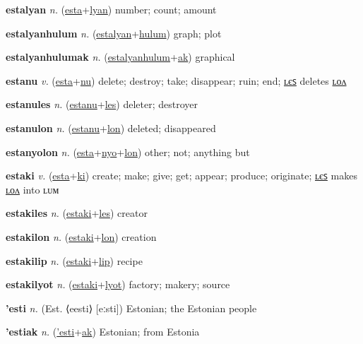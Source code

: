 \textbf{\hypertarget{estalyan}{estalyan}} \textit{n.} (\hyperlink{esta}{esta}+\allowbreak \hyperlink{lyan}{lyan})
number; count; amount

\textbf{\hypertarget{estalyanhulum}{estalyanhulum}} \textit{n.} (\hyperlink{estalyan}{estalyan}+\allowbreak \hyperlink{hulum}{hulum})
graph; plot

\textbf{\hypertarget{estalyanhulumak}{estalyanhulumak}} \textit{n.} (\hyperlink{estalyanhulum}{estalyanhulum}+\allowbreak \hyperlink{ak}{ak})
graphical

\textbf{\hypertarget{estanu}{estanu}} \textit{v.} (\hyperlink{esta}{esta}+\allowbreak \hyperlink{nu}{nu})
delete; destroy; take; disappear; ruin; end; \hyperlink{estanules}{ʟєꜱ} deletes \hyperlink{estanulon}{ʟᴏᴧ}

\textbf{\hypertarget{estanules}{estanules}} \textit{n.} (\hyperlink{estanu}{estanu}+\allowbreak \hyperlink{les}{les})
deleter; destroyer

\textbf{\hypertarget{estanulon}{estanulon}} \textit{n.} (\hyperlink{estanu}{estanu}+\allowbreak \hyperlink{lon}{lon})
deleted; disappeared

\textbf{\hypertarget{estanyolon}{estanyolon}} \textit{n.} (\hyperlink{esta}{esta}+\allowbreak \hyperlink{nyo}{nyo}+\allowbreak \hyperlink{lon}{lon})
other; not; anything but

\textbf{\hypertarget{estaki}{estaki}} \textit{v.} (\hyperlink{esta}{esta}+\allowbreak \hyperlink{ki}{ki})
create; make; give; get; appear; produce; originate; \hyperlink{estakiles}{ʟєꜱ} makes \hyperlink{estakilon}{ʟᴏᴧ} into ʟᴜᴍ

\textbf{\hypertarget{estakiles}{estakiles}} \textit{n.} (\hyperlink{estaki}{estaki}+\allowbreak \hyperlink{les}{les})
creator

\textbf{\hypertarget{estakilon}{estakilon}} \textit{n.} (\hyperlink{estaki}{estaki}+\allowbreak \hyperlink{lon}{lon})
creation

\textbf{\hypertarget{estakilip}{estakilip}} \textit{n.} (\hyperlink{estaki}{estaki}+\allowbreak \hyperlink{lip}{lip})
recipe

\textbf{\hypertarget{estakilyot}{estakilyot}} \textit{n.} (\hyperlink{estaki}{estaki}+\allowbreak \hyperlink{lyot}{lyot})
factory; makery; source

\textbf{\hypertarget{'esti}{'esti}} \textit{n.} (Est. ⟨eesti⟩ [eːsti])
Estonian; the Estonian people

\textbf{\hypertarget{'estiak}{'estiak}} \textit{n.} (\hyperlink{'esti}{'esti}+\allowbreak \hyperlink{ak}{ak})
Estonian; from Estonia

